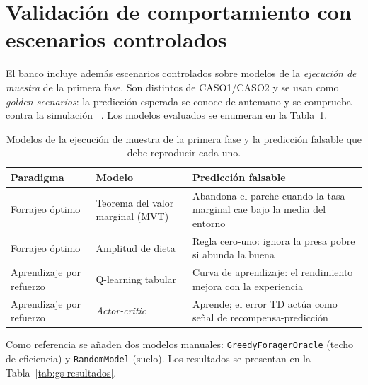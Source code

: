 \section[Escenarios controlados]{Validación de comportamiento con escenarios controlados}
\label{ap:capa3}

El banco incluye además escenarios controlados sobre modelos de la
\emph{ejecución de muestra} de la primera fase. Son distintos de CASO1/CASO2 y
se usan como \textit{golden scenarios}: la predicción esperada se conoce de
antemano y se comprueba contra la simulación
~\cite{wilson2019tenrules,palminteri2017falsification}. Los modelos evaluados
se enumeran en la Tabla~\ref{tab:modelos-sujeto}.

\begin{table}[H]
\begin{center}
\small
\renewcommand{\arraystretch}{1.16}
\begin{tabular}{|>{\raggedright\arraybackslash}p{2.8cm}|>{\raggedright\arraybackslash}p{3.6cm}|>{\raggedright\arraybackslash}p{5.0cm}|} \hline
\textbf{Paradigma} & \textbf{Modelo} & \textbf{Predicción falsable} \\ \hline
Forrajeo óptimo & Teorema del valor marginal (MVT) & Abandona el parche cuando la tasa marginal cae bajo la media del entorno~\cite{charnov1976mvt} \\ \hline
Forrajeo óptimo & Amplitud de dieta & Regla cero-uno: ignora la presa pobre si abunda la buena~\cite{macarthur1966dietbreadth} \\ \hline
Aprendizaje por refuerzo & Q-learning tabular & Curva de aprendizaje: el rendimiento mejora con la experiencia \\ \hline
Aprendizaje por refuerzo & \textit{Actor-critic} & Aprende; el error TD actúa como señal de recompensa-predicción \\ \hline
\end{tabular}
\caption[Modelos de los escenarios controlados]{Modelos de la ejecución de
muestra de la primera fase y la predicción falsable que debe reproducir cada uno.}
\label{tab:modelos-sujeto}
\end{center}
\end{table}

Como referencia se añaden dos modelos manuales: \texttt{GreedyForagerOracle}
(techo de eficiencia) y \texttt{RandomModel} (suelo). Los resultados se
presentan en la Tabla~\ref{tab:gs-resultados}.

